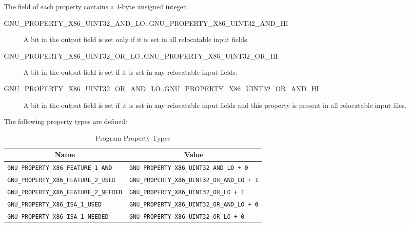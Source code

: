 The  field of each property contains a 4-byte unsigned
integer.

\begin{description}
 \item[GNU_PROPERTY_X86_UINT32_AND_LO..GNU_PROPERTY_X86_UINT32_AND_HI]
   A bit in the output  field is set only if it is set in
   all relocatable input  fields.
 \item[GNU_PROPERTY_X86_UINT32_OR_LO..GNU_PROPERTY_X86_UINT32_OR_HI]
   A bit in the output  field is set if it is set in any
   relocatable input  fields.
 \item[GNU_PROPERTY_X86_UINT32_OR_AND_LO..GNU_PROPERTY_X86_UINT32_OR_AND_HI]
   A bit in the output  field is set if  it is set in any
   relocatable input  fields and this property is present
   in all relocatable input files.
\end{description}

The following property types are defined:

\begin{table}[H]
\Hrule
  \caption{Program Property Types}
  \begin{center}
    \myfontsize
    \begin{tabular}[t]{l|l}
      \multicolumn{1}{c}{Name} & \multicolumn{1}{c}{Value} \\
      \hline
     \texttt{GNU_PROPERTY_X86_FEATURE_1_AND} &
     \texttt{GNU_PROPERTY_X86_UINT32_AND_LO + 0} \\
     \texttt{GNU_PROPERTY_X86_FEATURE_2_USED} &
     \texttt{GNU_PROPERTY_X86_UINT32_OR_AND_LO + 1} \\
     \texttt{GNU_PROPERTY_X86_FEATURE_2_NEEDED} &
     \texttt{GNU_PROPERTY_X86_UINT32_OR_LO + 1} \\
     \texttt{GNU_PROPERTY_X86_ISA_1_USED} &
     \texttt{GNU_PROPERTY_X86_UINT32_OR_AND_LO + 0} \\
     \texttt{GNU_PROPERTY_X86_ISA_1_NEEDED} &
     \texttt{GNU_PROPERTY_X86_UINT32_OR_LO + 0} \\
    \end{tabular}
  \end{center}
\Hrule
\end{table}

